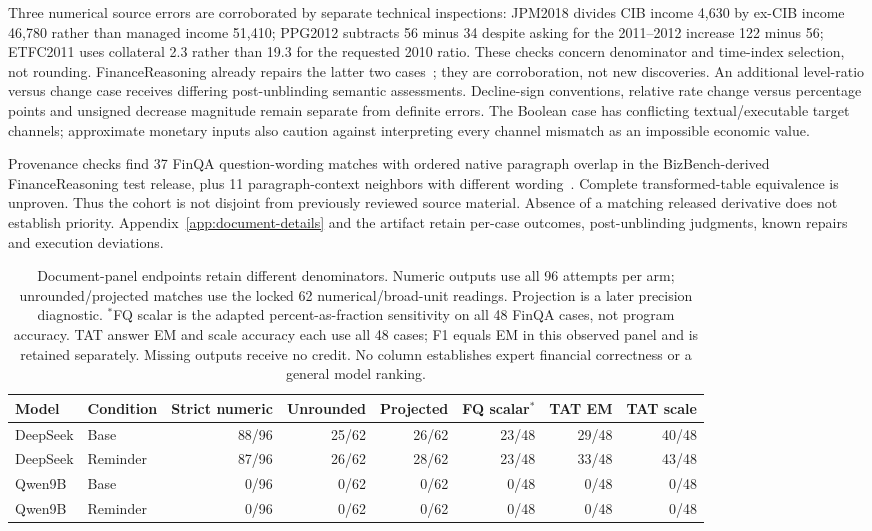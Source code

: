 Three numerical source errors are corroborated by separate technical inspections: JPM2018 divides CIB income 4,630 by ex-CIB income 46,780 rather than managed income 51,410; PPG2012 subtracts 56 minus 34 despite asking for the 2011--2012 increase 122 minus 56; ETFC2011 uses collateral 2.3 rather than 19.3 for the requested 2010 ratio. These checks concern denominator and time-index selection, not rounding. FinanceReasoning already repairs the latter two cases~\cite{financereasoning}; they are corroboration, not new discoveries. An additional level-ratio versus change case receives differing post-unblinding semantic assessments. Decline-sign conventions, relative rate change versus percentage points and unsigned decrease magnitude remain separate from definite errors. The Boolean case has conflicting textual/executable target channels; approximate monetary inputs also caution against interpreting every channel mismatch as an impossible economic value.

Provenance checks find 37 FinQA question-wording matches with ordered native paragraph overlap in the BizBench-derived FinanceReasoning test release, plus 11 paragraph-context neighbors with different wording~\cite{bizbench,financereasoning}. Complete transformed-table equivalence is unproven. Thus the cohort is not disjoint from previously reviewed source material. Absence of a matching released derivative does not establish priority. Appendix~\ref{app:document-details} and the artifact retain per-case outcomes, post-unblinding judgments, known repairs and execution deviations.

\begin{table}[!ht]
\centering\scriptsize\setlength{\tabcolsep}{4pt}
\begin{tabular}{llrrrrrr}
\toprule
Model & Condition & Strict numeric & Unrounded & Projected & FQ scalar$^*$ & TAT EM & TAT scale\\
\midrule
DeepSeek & Base & 88/96 & 25/62 & 26/62 & 23/48 & 29/48 & 40/48\\
DeepSeek & Reminder & 87/96 & 26/62 & 28/62 & 23/48 & 33/48 & 43/48\\
Qwen9B & Base & 0/96 & 0/62 & 0/62 & 0/48 & 0/48 & 0/48\\
Qwen9B & Reminder & 0/96 & 0/62 & 0/62 & 0/48 & 0/48 & 0/48\\
\bottomrule
\end{tabular}
\caption{Document-panel endpoints retain different denominators. Numeric outputs use all 96 attempts per arm; unrounded/projected matches use the locked 62 numerical/broad-unit readings. Projection is a later precision diagnostic. $^*$FQ scalar is the adapted percent-as-fraction sensitivity on all 48 FinQA cases, not program accuracy. TAT answer EM and scale accuracy each use all 48 cases; F1 equals EM in this observed panel and is retained separately. Missing outputs receive no credit. No column establishes expert financial correctness or a general model ranking.}
\label{tab:document-models}
\end{table}



